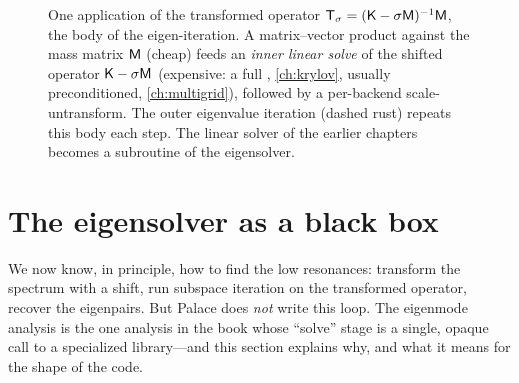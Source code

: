 \begin{figure}[t]
\centering
{}
\caption[The shift-invert apply and its inner solve]{One application of the
transformed operator $\mathsf{T}_\sigma=(\mathsf{K}-\sigma\mathsf{M})^{-1}\mathsf{M}$, the body of the
eigen-iteration. A matrix--vector product against the mass matrix $\mathsf{M}$ (cheap)
feeds an \emph{inner linear solve} of the shifted operator $\mathsf{K}-\sigma\mathsf{M}$
(expensive: a full , \cref{ch:krylov}, usually preconditioned,
\cref{ch:multigrid}), followed by a per-backend scale-untransform. The outer
eigenvalue iteration (dashed rust) repeats this body each step. The linear solver
of the earlier chapters becomes a subroutine of the eigensolver.}
\label{fig:si-apply}
\end{figure}

\section{The eigensolver as a black box}
\label{sec:blackbox}

We now know, in principle, how to find the low resonances: transform the spectrum
with a shift, run subspace iteration on the transformed operator, recover the
eigenpairs. But Palace does \emph{not} write this loop. The eigenmode analysis is
the one analysis in the book whose ``solve'' stage is a single, opaque call to a
specialized library---and this section explains why, and what it means for the
shape of the code.

